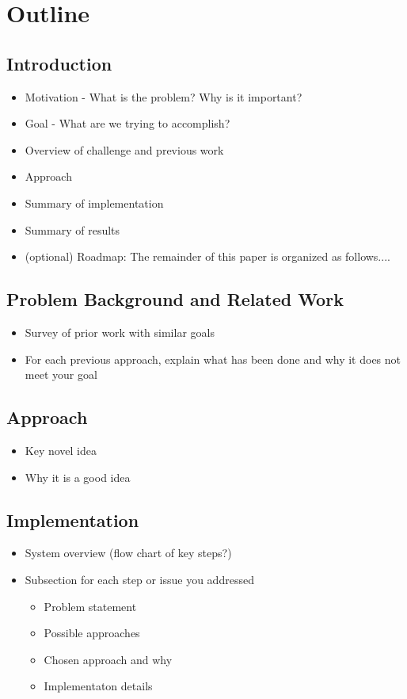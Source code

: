 \documentclass[pageno]{jpaper}
\begin{document}
\section{Outline}  

\subsection{Introduction}
\begin{itemize}
	\item Motivation - What is the problem? Why is it important?
	\item Goal - What are we trying to accomplish?
	\item Overview of challenge and previous work 
	\item Approach 
	\item Summary of implementation
	\item Summary of results
	\item (optional) Roadmap: The remainder of this paper is organized as follows....
\end{itemize}

\subsection{Problem Background and Related Work}
\begin{itemize}
	\item Survey of prior work with similar goals 
	\item For each previous approach, explain what has been done and why it does not meet your goal
\end{itemize}

\subsection{Approach}
\begin{itemize}
	\item Key novel idea
	\item Why it is a good idea
\end{itemize}

\subsection{Implementation}
\begin{itemize}
	\item System overview (flow chart of key steps?)
	\item Subsection for each step or issue you addressed
	\begin{itemize}
		\item Problem statement
		\item Possible approaches
		\item Chosen approach and why
		\item Implementaton details
	\end{itemize}
\end{itemize}
\end{document}
